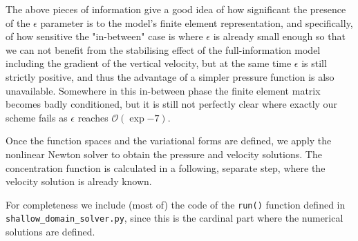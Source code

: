 \documentclass[12pt]{report}
\numberwithin{theorem}{chapter}
\numberwithin{corollary}{chapter}
\numberwithin{lemma}{chapter}
\numberwithin{remark}{chapter}
\numberwithin{definition}{chapter}
\numberwithin{prop}{chapter}
\begin{document}
The above pieces of information give a good idea of how significant the presence of the $\epsilon$ parameter is to the model's finite element representation, and specifically, of how sensitive the "in-between" case is where $\epsilon$ is already small enough so that we can not benefit from the stabilising effect of the full-information model including the gradient of the vertical velocity, but at the same time $\epsilon$ is still strictly positive, and thus the advantage of a simpler pressure function is also unavailable. Somewhere in this in-between phase the finite element matrix becomes badly conditioned, but it is still not perfectly clear where exactly our scheme fails as $\epsilon$ reaches $\mathcal{O}(\exp{-7}).$

Once the function spaces and the variational forms are defined, we apply the nonlinear Newton solver to obtain the pressure and velocity solutions. The concentration function is calculated in a following, separate step, where the velocity solution is already known.

For completeness we include (most of) the code of the \texttt{run()} function defined in \texttt{shallow\_domain\_solver.py}, since this is the cardinal part where the numerical solutions are defined.
\end{document}
